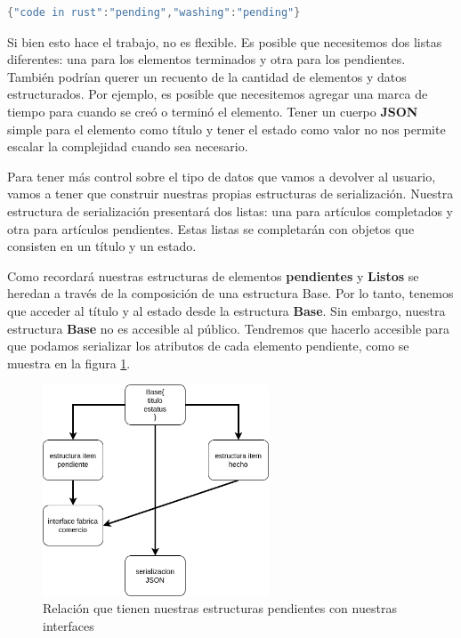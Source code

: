 \begin{lstlisting}[language=C]
{"code in rust":"pending","washing":"pending"}
\end{lstlisting}


Si bien esto hace el trabajo, no es flexible. Es posible que necesitemos dos listas diferentes: una para los elementos terminados y otra para los pendientes. También podrían querer un recuento de la cantidad de elementos y datos estructurados. Por ejemplo, es posible que necesitemos agregar una marca de tiempo para cuando se creó o terminó el elemento. Tener un cuerpo \textbf{JSON} simple para el elemento como título y tener el estado como valor no nos permite escalar la complejidad cuando sea necesario.

Para tener más control sobre el tipo de datos que vamos a devolver al usuario, vamos a tener que construir nuestras propias estructuras de serialización. Nuestra estructura de serialización presentará dos listas: una para artículos completados y otra para artículos pendientes. Estas listas se completarán con objetos que consisten en un título y un estado.

Como recordará nuestras estructuras de elementos \textbf{pendientes} y \textbf{Listos} se heredan a través de la composición de una estructura Base. Por lo tanto, tenemos que acceder al título y al estado desde la estructura \textbf{Base}. Sin embargo, nuestra estructura \textbf{Base} no es accesible al público. Tendremos que hacerlo accesible para que podamos serializar los atributos de cada elemento pendiente, como se muestra en la figura \ref{cap3:004}.


\begin{figure}[htb]
	\centering
	\includegraphics[width=0.6\textwidth]{capitulo3/estructura_comercio.png}
	\caption{Relación que tienen nuestras estructuras pendientes con nuestras interfaces}
	\label{cap3:004}
\end{figure}


